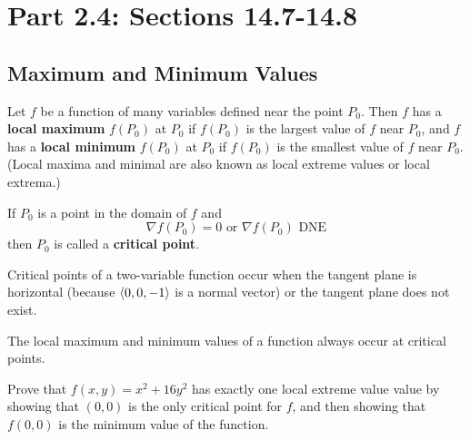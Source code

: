 \documentclass[letterpaper, twoside, 12pt]{book}
\begin{document}
\setcounter{chapter}{1}

\chapter{Part 2.4: Sections 14.7-14.8}

\setcounter{chapter}{14}
\setcounter{section}{6}

\section{Maximum and Minimum Values} %

\begin{definition}
  Let $f$ be a function of many variables defined near the point $P_0$.
  Then $f$ has a \textbf{local maximum} $f(P_0)$ at $P_0$ if $f(P_0)$ is the
  largest value of $f$ near $P_0$, and
  $f$ has a \textbf{local minimum} $f(P_0)$ at $P_0$ if $f(P_0)$ is the smallest
  value of $f$ near $P_0$.
  (Local maxima and minimal are also known as local extreme values or
  local extrema.)
\end{definition}

\begin{definition}
  If $P_0$ is a point in the domain of $f$ and
    \[
      \nabla f(P_0) = 0 \text{ or } \nabla f(P_0) \text{ DNE}
    \]
  then $P_0$ is called a \textbf{critical point}.
\end{definition}

\begin{theorem}
  Critical points of a two-variable function occur when the tangent plane
  is horizontal (because $\langle0,0,-1\rangle$ is a normal vector)
  or the tangent plane does not exist.
\end{theorem}

\begin{theorem}
  The local maximum and minimum values of a function always
  occur at critical points.
\end{theorem}

          \begin{problem}
            Prove that $f(x,y)=x^2+16y^2$ has exactly one local extreme value
            value by showing that $(0,0)$ is the only critical point
            for $f$, and then showing that $f(0,0)$ is the minimum value
            of the function.
          \end{problem}

          \begin{solution}

          \end{solution}
\end{document}
